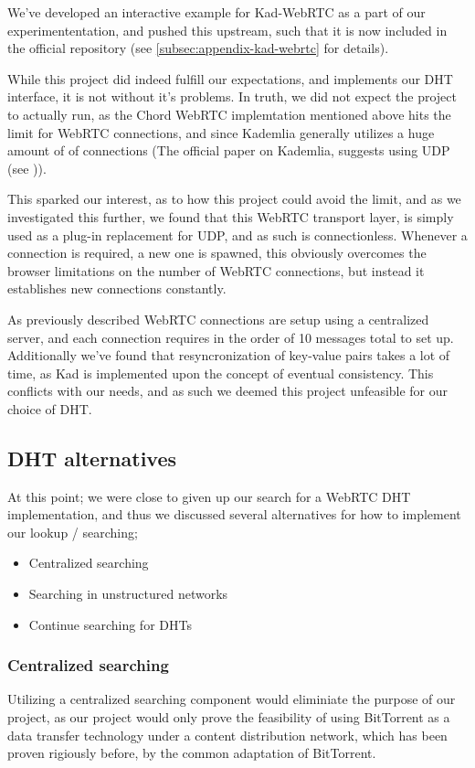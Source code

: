 We've developed an interactive example for Kad-WebRTC as a part of our
experimententation, and pushed this upstream, such that it is now included in 
the official repository (see \ref{subsec:appendix-kad-webrtc} for details).

While this project did indeed fulfill our expectations, and implements our DHT
interface, it is not without it's problems. In truth, we did not expect the 
project to actually run, as the Chord WebRTC implemtation mentioned above hits
the limit for WebRTC connections, and since Kademlia generally utilizes a huge
amount of of connections (The official paper on Kademlia, suggests using UDP
(see \citep{Maymounkov:Kademlia})).

This sparked our interest, as to how this project could avoid the limit, and as
we investigated this further, we found that this WebRTC transport layer, is
simply used as a plug-in replacement for UDP, and as such is connectionless.
Whenever a connection is required, a new one is spawned, this obviously
overcomes the browser limitations on the number of WebRTC connections, but 
instead it establishes new connections constantly.

As previously described WebRTC connections are setup using a centralized server,
and each connection requires in the order of 10 messages total to set up.
Additionally we've found that resyncronization of key-value pairs takes a lot
of time, as Kad is implemented upon the concept of eventual consistency. This
conflicts with our needs, and as such we deemed this project unfeasible for
our choice of DHT.

\subsection{DHT alternatives}
At this point; we were close to given up our search for a WebRTC DHT
implementation, and thus we discussed several alternatives for how to
implement our lookup / searching;
\begin{itemize}
\item Centralized searching
\item Searching in unstructured networks
\item Continue searching for DHTs
\end{itemize}

\subsubsection{Centralized searching}
Utilizing a centralized searching component would eliminiate the purpose of our
project, as our project would only prove the feasibility of using BitTorrent as
a data transfer technology under a content distribution network, which has been
proven rigiously before, by the common adaptation of BitTorrent.

